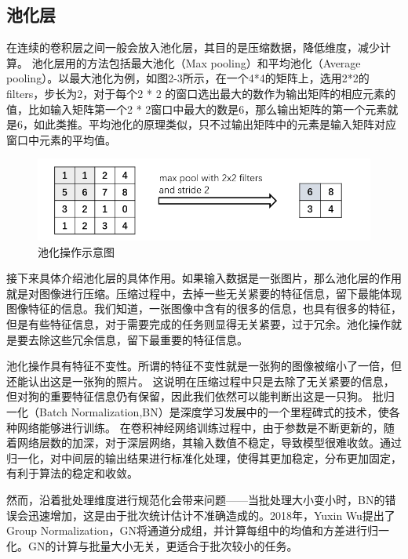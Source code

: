 \subsection{池化层}
在连续的卷积层之间一般会放入池化层，其目的是压缩数据，降低维度，减少计算。
池化层用的方法包括最大池化（Max pooling）和平均池化（Average pooling）。以最大池化为例，如图2-3所示，在一个4*4的矩阵上，选用2*2的filters，步长为2，对于每个2 * 2 的窗口选出最大的数作为输出矩阵的相应元素的值，比如输入矩阵第一个2 * 2窗口中最大的数是6，那么输出矩阵的第一个元素就是6，如此类推。平均池化的原理类似，只不过输出矩阵中的元素是输入矩阵对应窗口中元素的平均值。
\begin{figure}[h]
\begin{center}
\includegraphics[width=1\textwidth]{figures/CNN3.png}
\end{center}
\vspace{-5mm}
\caption{池化操作示意图}
\end{figure}

接下来具体介绍池化层的具体作用。如果输入数据是一张图片，那么池化层的作用就是对图像进行压缩。压缩过程中，去掉一些无关紧要的特征信息，留下最能体现图像特征的信息。我们知道，一张图像中含有的很多的信息，也具有很多的特征，但是有些特征信息，对于需要完成的任务则显得无关紧要，过于冗余。池化操作就是要去除这些冗余信息，留下最重要的特征信息。

池化操作具有特征不变性。所谓的特征不变性就是一张狗的图像被缩小了一倍，但还能认出这是一张狗的照片。
这说明在压缩过程中只是去除了无关紧要的信息，但对狗的重要特征信息仍有保留，因此我们依然可以能判断出这是一只狗。
批归一化（Batch Normalization,BN）是深度学习发展中的一个里程碑式的技术，使各种网络能够进行训练。
在卷积神经网络训练过程中，由于参数是不断更新的，随着网络层数的加深，对于深层网络，其输入数值不稳定，导致模型很难收敛。通过归一化，对中间层的输出结果进行标准化处理，使得其更加稳定，分布更加固定，有利于算法的稳定和收敛。

然而，沿着批处理维度进行规范化会带来问题——当批处理大小变小时，BN的错误会迅速增加，这是由于批次统计估计不准确造成的。2018年，Yuxin Wu提出了Group Normalization，GN将通道分成组，并计算每组中的均值和方差进行归一化。GN的计算与批量大小无关，更适合于批次较小的任务。

